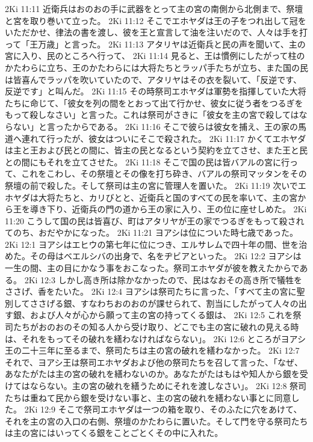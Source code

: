 2Ki 11:11  近衛兵はおのおの手に武器をとって主の宮の南側から北側まで、祭壇と宮を取り巻いて立った。
2Ki 11:12  そこでエホヤダは王の子をつれ出して冠をいただかせ、律法の書を渡し、彼を王と宣言して油を注いだので、人々は手を打って「王万歳」と言った。
2Ki 11:13  アタリヤは近衛兵と民の声を聞いて、主の宮に入り、民のところへ行って、
2Ki 11:14  見ると、王は慣例にしたがって柱のかたわらに立ち、王のかたわらには大将たちとラッパ手たちが立ち、また国の民は皆喜んでラッパを吹いていたので、アタリヤはその衣を裂いて、「反逆です、反逆です」と叫んだ。
2Ki 11:15  その時祭司エホヤダは軍勢を指揮していた大将たちに命じて、「彼女を列の間をとおって出て行かせ、彼女に従う者をつるぎをもって殺しなさい」と言った。これは祭司がさきに「彼女を主の宮で殺してはならない」と言ったからである。
2Ki 11:16  そこで彼らは彼女を捕え、王の家の馬道へ連れて行ったが、彼女はついにそこで殺された。
2Ki 11:17  かくてエホヤダは主と王および民との間に、皆主の民となるという契約を立てさせ、また王と民との間にもそれを立てさせた。
2Ki 11:18  そこで国の民は皆バアルの宮に行って、これをこわし、その祭壇とその像を打ち砕き、バアルの祭司マッタンをその祭壇の前で殺した。そして祭司は主の宮に管理人を置いた。
2Ki 11:19  次いでエホヤダは大将たちと、カリびとと、近衛兵と国のすべての民を率いて、主の宮から王を導き下り、近衛兵の門の道から王の家に入り、王の位に座せしめた。
2Ki 11:20  こうして国の民は皆喜び、町はアタリヤが王の家でつるぎをもって殺されてのち、おだやかになった。
2Ki 11:21  ヨアシは位についた時七歳であった。
2Ki 12:1  ヨアシはエヒウの第七年に位につき、エルサレムで四十年の間、世を治めた。その母はベエルシバの出身で、名をヂビアといった。
2Ki 12:2  ヨアシは一生の間、主の目にかなう事をおこなった。祭司エホヤダが彼を教えたからである。
2Ki 12:3  しかし高き所は除かなかったので、民はなおその高き所で犠牲をささげ、香をたいた。
2Ki 12:4  ヨアシは祭司たちに言った、「すべて主の宮に聖別してささげる銀、すなわちおのおのが課せられて、割当にしたがって人々の出す銀、および人々が心から願って主の宮の持ってくる銀は、
2Ki 12:5  これを祭司たちがおのおのその知る人から受け取り、どこでも主の宮に破れの見える時は、それをもってその破れを繕わなければならない」。
2Ki 12:6  ところがヨアシ王の二十三年に至るまで、祭司たちは主の宮の破れを繕わなかった。
2Ki 12:7  それで、ヨアシ王は祭司エホヤダおよび他の祭司たちを召して言った、「なぜ、あなたがたは主の宮の破れを繕わないのか。あなたがたはもはや知人から銀を受けてはならない。主の宮の破れを繕うためにそれを渡しなさい」。
2Ki 12:8  祭司たちは重ねて民から銀を受けない事と、主の宮の破れを繕わない事とに同意した。
2Ki 12:9  そこで祭司エホヤダは一つの箱を取り、そのふたに穴をあけて、それを主の宮の入口の右側、祭壇のかたわらに置いた。そして門を守る祭司たちは主の宮にはいってくる銀をことごとくその中に入れた。
